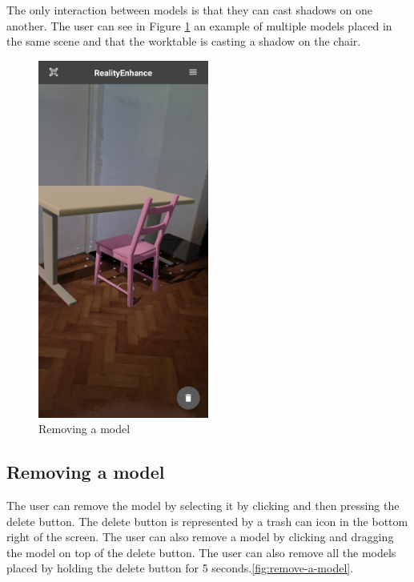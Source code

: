 The only interaction between models is that they can cast shadows on one another. The user can see in Figure \ref{fig:multiple-models} an example of multiple models placed in the same scene and that the worktable is casting a shadow on the chair.

\begin{figure}[ht]
    \begin{center}
        \includegraphics[width=0.5\textwidth]{img/App_screenshots/Multiple-models.jpg}
        \caption{Removing a model}
        \label{fig:multiple-models}
    \end{center}
\end{figure}
\pagebreak

\subsection{Removing a model}
The user can remove the model by selecting it by clicking and then pressing the delete button. The delete button is represented by a trash can icon in the bottom right of the screen. The user can also remove a model by clicking and dragging the model on top of the delete button. The user can also remove all the models placed by holding the delete button for 5 seconds.\ref{fig:remove-a-model}.

